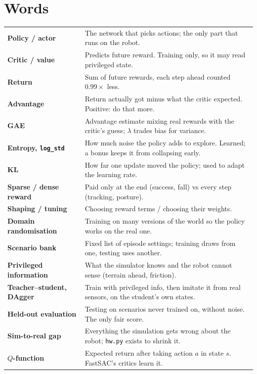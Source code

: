 \documentclass[10pt,letterpaper]{article}
\begin{document}
\section{Words}

\begin{small}
\begin{tabularx}{\linewidth}{@{}>{\bfseries}p{3.4cm}X@{}}
\toprule
Policy / actor & The network that picks actions; the only part that runs on the robot. \\
Critic / value & Predicts future reward. Training only, so it may read privileged state. \\
Return & Sum of future rewards, each step ahead counted $0.99\times$ less. \\
Advantage & Return actually got minus what the critic expected. Positive: do that more. \\
GAE & Advantage estimate mixing real rewards with the critic's guess; $\lambda$ trades bias for variance. \\
Entropy, \texttt{log\_std} & How much noise the policy adds to explore. Learned; a bonus keeps it from collapsing early. \\
KL & How far one update moved the policy; used to adapt the learning rate. \\
Sparse / dense reward & Paid only at the end (success, fall) vs every step (tracking, posture). \\
Shaping / tuning & Choosing reward terms / choosing their weights. \\
Domain randomisation & Training on many versions of the world so the policy works on the real one. \\
Scenario bank & Fixed list of episode settings; training draws from one, testing uses another. \\
Privileged information & What the simulator knows and the robot cannot sense (terrain ahead, friction). \\
Teacher–student, DAgger & Train with privileged info, then imitate it from real sensors, on the student's own states. \\
Held-out evaluation & Testing on scenarios never trained on, without noise. The only fair score. \\
Sim-to-real gap & Everything the simulation gets wrong about the robot; \texttt{hw.py} exists to shrink it. \\
$Q$-function & Expected return after taking action $a$ in state $s$. FastSAC's critics learn it. \\

\end{tabularx}
\end{small}
\end{document}
